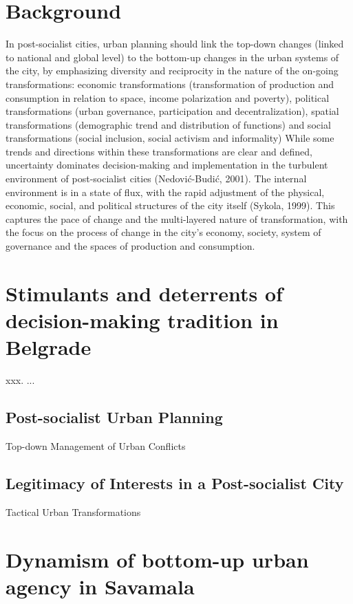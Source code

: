 \documentclass[11pt]{report}
\begin{document}
\section{Background}
In post-socialist cities, urban planning should link the top-down changes (linked to national and global level) to the bottom-up changes in the urban systems of the city, by emphasizing diversity and reciprocity in the nature of the on-going transformations: economic transformations (transformation of production and consumption in relation to space, income polarization and poverty), political transformations (urban governance, participation and decentralization), spatial transformations (demographic trend and distribution of functions) and social transformations (social inclusion, social activism and informality)
While some trends and directions within these transformations are clear and defined, uncertainty dominates decision-making and implementation in the turbulent environment of post-socialist cities (Nedović-Budić, 2001). The internal environment is in a state of flux, with the rapid adjustment of the physical, economic, social, and political structures of the city itself (Sykola, 1999). This captures the pace of change and the multi-layered nature of transformation, with the focus on the process of change in the city’s economy, society, system of governance and the spaces of production and consumption.
\section{Stimulants and deterrents of decision-making tradition in Belgrade}

xxx. ...

\subsection{Post-socialist Urban Planning}

Top-down Management of Urban Conflicts

\subsection{Legitimacy of Interests in a Post-socialist City}

Tactical Urban Transformations 

\section{Dynamism of bottom-up urban agency in Savamala}
\end{document}
